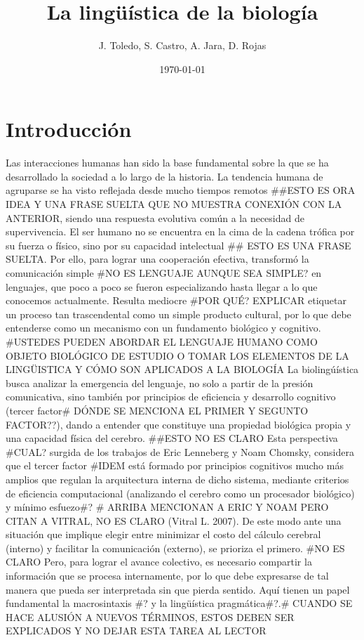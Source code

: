 \documentclass[12pt]{article}
\title{La lingüística de la biología}
\author{J. Toledo, S. Castro, A. Jara, D. Rojas}
\date{\today}
\begin{document}
\maketitle

\section{Introducción}

Las interacciones humanas han sido la base fundamental sobre la que se ha desarrollado la sociedad a lo largo de la historia. La tendencia humana de agruparse se ha visto reflejada desde mucho tiempos remotos ##ESTO ES ORA IDEA Y UNA FRASE SUELTA QUE NO MUESTRA CONEXIÓN CON LA ANTERIOR, siendo una respuesta evolutiva común a la necesidad de supervivencia. El ser humano no se encuentra en la cima de la cadena trófica por su fuerza o físico, sino por su capacidad intelectual ## ESTO ES UNA FRASE SUELTA. Por ello, para lograr una cooperación efectiva, transformó la comunicación simple #NO ES LENGUAJE AUNQUE SEA SIMPLE? en lenguajes, que poco a poco se fueron especializando hasta llegar a lo que conocemos actualmente. Resulta mediocre #POR QUÉ? EXPLICAR etiquetar un proceso tan trascendental como un simple producto cultural, por lo que debe entenderse como un mecanismo con un fundamento biológico y cognitivo. #USTEDES PUEDEN ABORDAR EL LENGUAJE HUMANO COMO OBJETO BIOLÓGICO DE ESTUDIO O TOMAR LOS ELEMENTOS DE LA LINGÜISTICA Y CÓMO SON APLICADOS A LA BIOLOGÍA
La biolingúística busca analizar la emergencia del lenguaje, no solo a partir de la presión comunicativa, sino también por principios de eficiencia y desarrollo cognitivo (tercer factor# DÓNDE SE MENCIONA EL PRIMER Y SEGUNTO FACTOR??), dando a entender que constituye una propiedad biológica propia y una capacidad física del cerebro. ##ESTO NO ES CLARO
Esta perspectiva #CUAL? surgida de los trabajos de Eric Lenneberg y Noam Chomsky, considera que el tercer factor #IDEM está formado por principios cognitivos mucho más amplios que regulan la arquitectura interna de dicho sistema, mediante criterios de eficiencia computacional (analizando el cerebro como un procesador biológico) y mínimo esfuezo#? # ARRIBA MENCIONAN A ERIC Y NOAM PERO CITAN A VITRAL, NO ES CLARO (Vitral L. 2007). De este modo ante una situación que implique elegir entre minimizar el costo del cálculo cerebral (interno) y facilitar la comunicación (externo), se prioriza el primero. #NO ES CLARO
Pero, para lograr el avance colectivo, es necesario compartir la información que se procesa internamente, por lo que debe expresarse de tal manera que pueda ser interpretada sin que pierda sentido. Aquí tienen un papel fundamental la macrosintaxis #? y la lingüística pragmática#?.# CUANDO SE HACE ALUSIÓN A NUEVOS TÉRMINOS, ESTOS DEBEN SER EXPLICADOS Y NO DEJAR ESTA TAREA AL LECTOR
\end{document}
